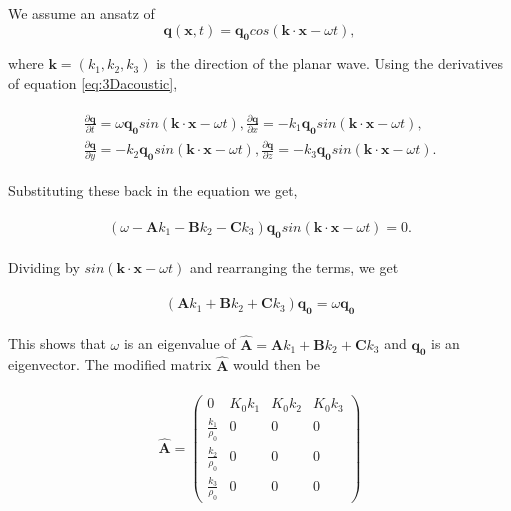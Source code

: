 We assume an ansatz of 
\begin{equation}
    \mathbf{q}\left(\mathbf{x}, t\right) = \mathbf{q_0} cos\left(\mathbf{k}\cdot\mathbf{x} - \omega t\right),
\end{equation}

where $\mathbf{k}=\left(k_1, k_2, k_3\right)$ is the direction of the planar wave. Using the derivatives of equation \ref{eq:3Dacoustic},

\begin{align}
    \begin{split}
    \frac{\partial \mathbf{q}}{\partial t} = \omega \mathbf{q_0} sin\left(\mathbf{k}\cdot\mathbf{x} - \omega t\right),
    \frac{\partial \mathbf{q}}{\partial x} = -k_1 \mathbf{q_0} sin\left(\mathbf{k}\cdot\mathbf{x} - \omega t\right), \\
    \frac{\partial \mathbf{q}}{\partial y} = -k_2 \mathbf{q_0} sin\left(\mathbf{k}\cdot\mathbf{x} - \omega t\right),
    \frac{\partial \mathbf{q}}{\partial z} = -k_3 \mathbf{q_0} sin\left(\mathbf{k}\cdot\mathbf{x} - \omega t\right).
\end{split}
\end{align}

Substituting these back in the equation we get,

\begin{align}
    \begin{split}
        \left(\omega - \mathbf{A}k_1 - \mathbf{B}k_2 - \mathbf{C}k_3\right)\mathbf{q_0}sin\left(\mathbf{k}\cdot\mathbf{x} - \omega t\right) = 0.
    \end{split}
\end{align}

Dividing by $sin\left(\mathbf{k}\cdot\mathbf{x} - \omega t\right)$ and rearranging the terms, we get

\begin{align}
    \begin{split}
        \left(\mathbf{A}k_1 + \mathbf{B}k_2 + \mathbf{C}k_3\right)\mathbf{q_0} = \omega \mathbf{q_0}
    \end{split}
\end{align}

This shows that $\omega$ is an eigenvalue of $\mathbf{\hat{A}} = \mathbf{A}k_1 + \mathbf{B}k_2 + \mathbf{C}k_3$ and $\mathbf{q_0}$ is an eigenvector. The modified matrix $\mathbf{\hat{A}}$ would then be

\begin{align}
    \begin{split}
    \mathbf{\hat{A}} = \left(\begin{array}{rrrr}
0 & K_{0} k_{1} & K_{0} k_{2} & K_{0} k_{3} \\
\frac{k_{1}}{\rho_{0}} & 0 & 0 & 0 \\
\frac{k_{2}}{\rho_{0}} & 0 & 0 & 0 \\
\frac{k_{3}}{\rho_{0}} & 0 & 0 & 0
\end{array}\right)
    \end{split}
\end{align}

